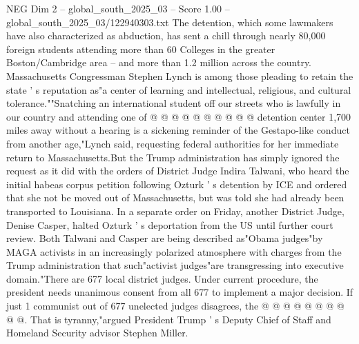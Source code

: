 \begin{textsample}{NEG Dim 2 – global\_south\_2025\_03 – Score 1.00 – global\_south\_2025\_03/122940303.txt}
The detention, which some lawmakers have also characterized as abduction, has sent a chill through nearly 80,000 foreign students attending more than 60 Colleges in the greater Boston/Cambridge area -- and more than 1.2 million across the country.
Massachusetts Congressman Stephen Lynch is among those pleading to retain the state ' s reputation as"a center of learning and intellectual, religious, and cultural tolerance.""Snatching an international student off our streets who is lawfully in our country and attending one of @ @ @ @ @ @ @ @ @ @ detention center 1,700 miles away without a hearing is a sickening reminder of the Gestapo-like conduct from another age,"Lynch said, requesting federal authorities for her immediate return to Massachusetts.But the Trump administration has simply ignored the request as it did with the orders of District Judge Indira Talwani, who heard the initial habeas corpus petition following Ozturk ' s detention by ICE and ordered that she not be moved out of Massachusetts, but was told she had already been transported to Louisiana.
In a separate order on Friday, another District Judge, Denise Casper, halted Ozturk ' s deportation from the US until further court review.
Both Talwani and Casper are being described as"Obama judges"by MAGA activists in an increasingly polarized atmosphere with charges from the Trump administration that such"activist judges"are transgressing into executive domain."There are 677 local district judges.
Under current procedure, the president needs unanimous consent from all 677 to implement a major decision.
If just 1 communist out of 677 unelected judges disagrees, the @ @ @ @ @ @ @ @ @ @.
That is tyranny,"argued President Trump ' s Deputy Chief of Staff and Homeland Security advisor Stephen Miller.

\end{textsample}
